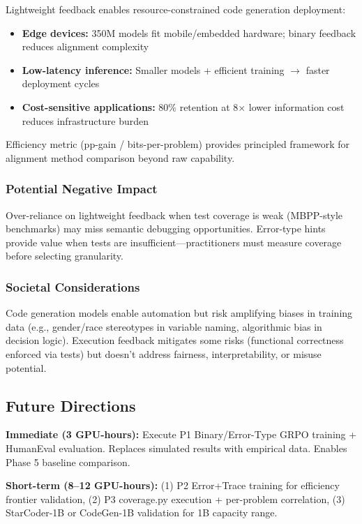 Lightweight feedback enables resource-constrained code generation deployment:
\begin{itemize}
\item \textbf{Edge devices:} 350M models fit mobile/embedded hardware; binary feedback reduces alignment complexity
\item \textbf{Low-latency inference:} Smaller models + efficient training $\rightarrow$ faster deployment cycles
\item \textbf{Cost-sensitive applications:} 80\% retention at 8$\times$ lower information cost reduces infrastructure burden
\end{itemize}

Efficiency metric (pp-gain / bits-per-problem) provides principled framework for alignment method comparison beyond raw capability.

\subsubsection{Potential Negative Impact}

Over-reliance on lightweight feedback when test coverage is weak (MBPP-style benchmarks) may miss semantic debugging opportunities. Error-type hints provide value when tests are insufficient---practitioners must measure coverage before selecting granularity.

\subsubsection{Societal Considerations}

Code generation models enable automation but risk amplifying biases in training data (e.g., gender/race stereotypes in variable naming, algorithmic bias in decision logic). Execution feedback mitigates some risks (functional correctness enforced via tests) but doesn't address fairness, interpretability, or misuse potential.

\subsection{Future Directions}

\textbf{Immediate (3 GPU-hours):} Execute P1 Binary/Error-Type GRPO training + HumanEval evaluation. Replaces simulated results with empirical data. Enables Phase 5 baseline comparison.

\textbf{Short-term (8--12 GPU-hours):} (1) P2 Error+Trace training for efficiency frontier validation, (2) P3 coverage.py execution + per-problem correlation, (3) StarCoder-1B or CodeGen-1B validation for 1B capacity range.

